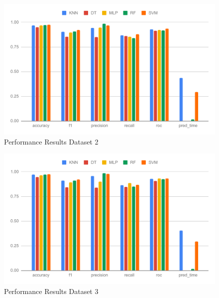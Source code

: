 {    \begin{figure}[ht]
        \centering
        \includegraphics[width=1.9\columnwidth]{media/ch_result_and_testing/perf_ds_2.pdf}
        \caption{Performance Results Dataset 2} \label{fig:perfromance_results_dataset_2}
    \end{figure}

    \begin{figure}[ht]
        \centering
        \includegraphics[width=1.9\columnwidth]{media/ch_result_and_testing/perf_ds_3.pdf}
        \caption{Performance Results Dataset 3} \label{fig:perfromance_results_dataset_3}
    \end{figure}

}
